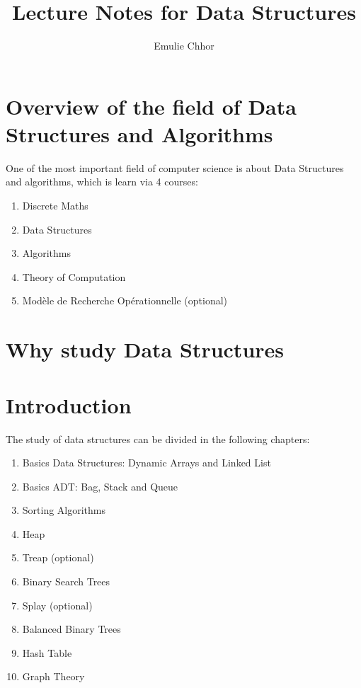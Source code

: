 \documentclass{article}
\begin{document}
\title{Lecture Notes for Data Structures}
\author{Emulie Chhor}
\maketitle

\section{Overview of the field of Data Structures and Algorithms}

One of the most important field of computer science is about Data Structures and
algorithms, which is learn via 4 courses:

\begin{enumerate}
    \item Discrete Maths
    \item Data Structures
    \item Algorithms
    \item Theory of Computation
    \item Modèle de Recherche Opérationnelle (optional)
\end{enumerate}

\section{Why study Data Structures}

\section{Introduction}

The study of data structures can be divided in the following chapters:

\begin{enumerate}
    \item Basics Data Structures: Dynamic Arrays and Linked List
    \item Basics ADT: Bag, Stack and Queue
    \item Sorting Algorithms
    \item Heap
    \item Treap (optional)
    \item Binary Search Trees
    \item Splay (optional)
    \item Balanced Binary Trees
    \item Hash Table
    \item Graph Theory
\end{enumerate}
\end{document}
